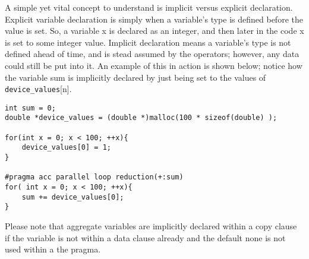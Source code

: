 A simple yet vital concept to understand is implicit versus explicit declaration. Explicit variable declaration is simply when a variable's type is defined before the value is set. So, a variable x is declared as an integer, and then later in the code x is set to some integer value. Implicit declaration means a variable's type is not defined ahead of time, and is stead assumed by the operators; however, any data could still be put into it. An example of this in action is shown below; notice how the variable sum is implicitly declared by just being set to the values of \texttt{device\_values}[n]. 

\begin{Code}
\begin{lstlisting}[frame=single, caption=combinedConstructs.c, label=prototype, numbers=none]
int sum = 0;
double *device_values = (double *)malloc(100 * sizeof(double) );

for(int x = 0; x < 100; ++x){
    device_values[0] = 1;
}

#pragma acc parallel loop reduction(+:sum)
for( int x = 0; x < 100; ++x){
    sum += device_values[0];
}
\end{lstlisting}
\end{Code}

Please note that aggregate variables are implicitly declared within a copy clause if the variable is not within a data clause already and the default none is not used within a the pragma. 